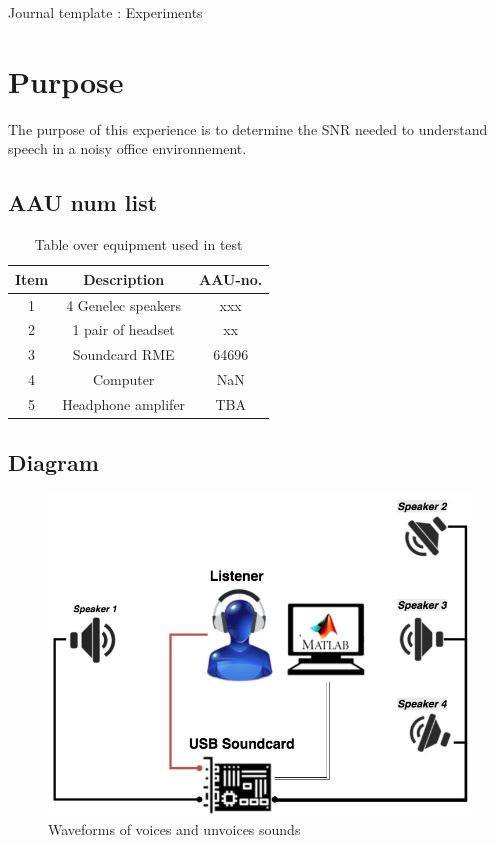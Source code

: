 \documentclass[12pt,a4paper]{article}
\begin{document}
\begin{Huge}
\begin{center}
Journal template : Experiments
\end{center}
\end{Huge}


\section{Purpose}

The purpose of this experience is to determine the SNR needed to understand speech in a noisy office environnement.

\subsection{AAU num list}

\begin{table}[h]
	\centering
	
	\begin{tabular}{ c c c } \toprule
		{Item} & {Description} & {AAU-no}. \\ \bottomrule 
		1      &  4 Genelec speakers						& xxx	\\
		2      &  1 pair of headset						& xx		\\
		3      &  Soundcard RME                      	& 64696		\\
		4      &  Computer								   & NaN		\\  
		5      &  Headphone amplifer    				& TBA		\\ \bottomrule 
	\end{tabular}
	\caption{Table over equipment used in test}
	\label{tab:UsedEquipmentListning1}
\end{table}



\subsection{Diagram}

\begin{figure}[H]
	\label{fig1}
	\centering
		\includegraphics[width=12cm]{setup}
		\caption{Waveforms of voices and unvoices sounds}
	\end{figure}
\end{document}
